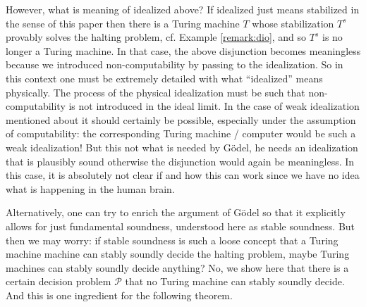 \documentclass{amsart}  %
\numberwithin{equation}{section}
\theoremstyle{definition}
\theoremstyle{remark}
\begin{document}
{However, what is meaning of idealized above?  If idealized just means stabilized in the sense of this paper then there is a Turing machine $T $ whose stabilization $T ^{s} $ provably solves the halting problem, cf. Example \ref{remark:dio}, and so $T ^{s} $ is no longer a Turing machine. In that case, the above disjunction becomes meaningless because we introduced non-computability by passing to the idealization.
So in this context one must be extremely detailed with what ``idealized'' means physically. 
The process of the physical idealization must be such that non-computability is not introduced in the ideal limit. In the case of weak idealization mentioned about it should certainly be possible, especially under the assumption of computability: the corresponding Turing machine / computer would be such a weak idealization! But this not what is needed by G\"odel, he needs an idealization that is plausibly sound otherwise the disjunction would again be meaningless. In this case, it is absolutely not clear if and how this can work since we have no idea what is happening in the human brain.

Alternatively, one can try to enrich the argument of G\"odel so that it explicitly allows for just fundamental soundness, understood here as stable soundness. But then we may worry: if stable soundness is such a loose concept that a Turing machine machine can stably soundly decide the halting problem, maybe Turing machines can stably soundly decide anything? No, we show here that there is a certain decision problem $\mathcal{P}$ that no Turing machine can stably soundly decide. And this is one ingredient for the following theorem.


}
\end{document}
